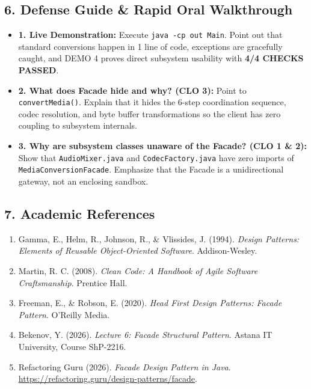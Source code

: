 \documentclass[10pt,a4paper]{article}
\begin{document}
\subsection*{6. Defense Guide \& Rapid Oral Walkthrough}
\begin{itemize}[noitemsep,topsep=1pt,leftmargin=1.5em]
    \item \textbf{1. Live Demonstration:} Execute \texttt{java -cp out Main}. Point out that standard conversions happen in 1 line of code, exceptions are gracefully caught, and DEMO 4 proves direct subsystem usability with \textbf{4/4 CHECKS PASSED}.
    \item \textbf{2. What does Facade hide and why? (CLO 3):} Point to \texttt{convertMedia()}. Explain that it hides the 6-step coordination sequence, codec resolution, and byte buffer transformations so the client has zero coupling to subsystem internals.
    \item \textbf{3. Why are subsystem classes unaware of the Facade? (CLO 1 \& 2):} Show that \texttt{AudioMixer.java} and \texttt{CodecFactory.java} have zero imports of \texttt{MediaConversionFacade}. Emphasize that the Facade is a unidirectional gateway, not an enclosing sandbox.
\end{itemize}

\subsection*{7. Academic References}
\begin{enumerate}[noitemsep,topsep=1pt,leftmargin=1.5em]
    \item Gamma, E., Helm, R., Johnson, R., \& Vlissides, J. (1994). \textit{Design Patterns: Elements of Reusable Object-Oriented Software}. Addison-Wesley.
    \item Martin, R. C. (2008). \textit{Clean Code: A Handbook of Agile Software Craftsmanship}. Prentice Hall.
    \item Freeman, E., \& Robson, E. (2020). \textit{Head First Design Patterns: Facade Pattern}. O'Reilly Media.
    \item Bekenov, Y. (2026). \textit{Lecture 6: Facade Structural Pattern}. Astana IT University, Course ShP-2216.
    \item Refactoring Guru (2026). \textit{Facade Design Pattern in Java}. \url{https://refactoring.guru/design-patterns/facade}.
\end{enumerate}
\end{document}
